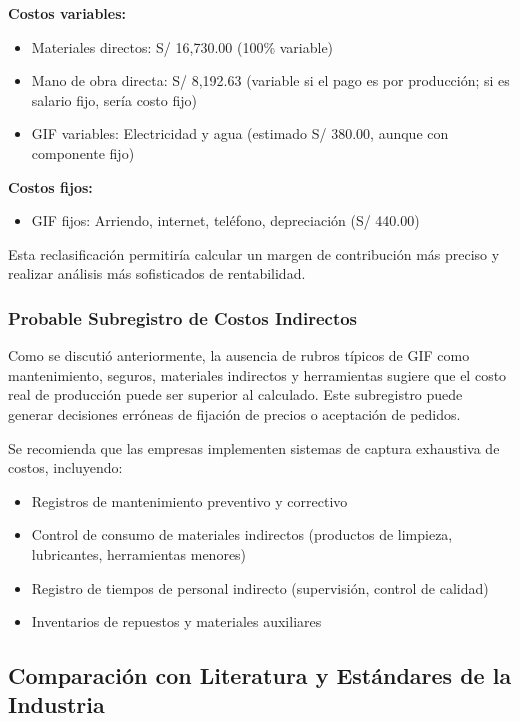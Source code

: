 \documentclass[
  stu,
  floatsintext,
  longtable,
  a4paper,
  nolmodern,
  notxfonts,
  notimes,
  12pt,
  colorlinks=true,linkcolor=blue,citecolor=blue,urlcolor=blue]{apa7}
\providecommand{\tightlist}{%
  \setlength{\itemsep}{0pt}\setlength{\parskip}{0pt}}
\begin{document}
\textbf{Costos variables:}

\begin{itemize}
\tightlist
\item
  Materiales directos: S/ 16,730.00 (100\% variable)
\item
  Mano de obra directa: S/ 8,192.63 (variable si el pago es por
  producción; si es salario fijo, sería costo fijo)
\item
  GIF variables: Electricidad y agua (estimado S/ 380.00, aunque con
  componente fijo)
\end{itemize}

\textbf{Costos fijos:}

\begin{itemize}
\tightlist
\item
  GIF fijos: Arriendo, internet, teléfono, depreciación (S/ 440.00)
\end{itemize}

Esta reclasificación permitiría calcular un margen de contribución más
preciso y realizar análisis más sofisticados de rentabilidad.

\subsubsection{Probable Subregistro de Costos
Indirectos}\label{probable-subregistro-de-costos-indirectos}

Como se discutió anteriormente, la ausencia de rubros típicos de GIF
como mantenimiento, seguros, materiales indirectos y herramientas
sugiere que el costo real de producción puede ser superior al calculado.
Este subregistro puede generar decisiones erróneas de fijación de
precios o aceptación de pedidos.

Se recomienda que las empresas implementen sistemas de captura
exhaustiva de costos, incluyendo:

\begin{itemize}
\tightlist
\item
  Registros de mantenimiento preventivo y correctivo
\item
  Control de consumo de materiales indirectos (productos de limpieza,
  lubricantes, herramientas menores)
\item
  Registro de tiempos de personal indirecto (supervisión, control de
  calidad)
\item
  Inventarios de repuestos y materiales auxiliares
\end{itemize}

\subsection{Comparación con Literatura y Estándares de la
Industria}\label{comparaciuxf3n-con-literatura-y-estuxe1ndares-de-la-industria}
\end{document}
